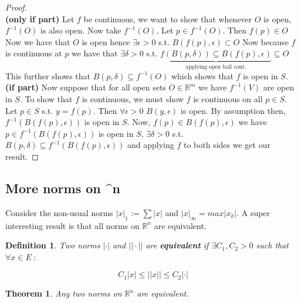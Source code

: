 \documentclass[titlepage]{article}
\newtheorem{theorem}{Theorem}[section]
\newtheorem{definition}{Definition}
\newcommand{\Rn}{\mathbb{R}^n}
\newcommand{\Rm}{\mathbb{R}^m}
\begin{document}
\begin{proof}
\\
\textbf{(only if part)}
Let $f$ be continuous, we want to show that whenever $O$ is open, $f^{-1}(O)$ is also open. Now take $f^{-1}(O)$. Let $p \in f^{-1}(O)$. Then $f(p) \in O$ Now we have that $O$ is open hence $\exists \epsilon > 0$ s.t. $B(f(p),\epsilon) \subset O$ Now because $f$ is continuous at $p$ we have that $\exists \delta > 0$ s.t. $\underbrace{f(B(p, \delta)) \subseteq B(f(p), \epsilon)}_{\text{applying open ball cont.}} \subseteq O$ This further shows that $B(p, \delta) \subseteq f^{-1}(O)$ which shows that $f$ is open in $S$.
\\

\textbf{(if part)}
Now suppose that for all open sets $O \in \Rm$ we have $f^{-1}(V)$ are open in $S$. To show that $f$ is continuous, we must show $f$ is continuous on all $p \in S$. Let $p \in S$ s.t. $y = f(p)$. Then $\forall \epsilon > 0$ $B(y,\epsilon)$ is open. By assumption then, $f^{-1}(B(f(p), \epsilon))$ is open in $S$. Now, $f(p) \in B(f(p), \epsilon)$ we have $p \in f^{-1}(B(f(p), \epsilon))$ is open in $S$, $\exists \delta > 0$ s.t. $B(p, \delta) \subseteq f^{-1}(B(f(p), \epsilon))$ and applying $f$ to both sides we get our result. 
\end{proof}

\subsection{More norms on \Rn}
Consider the non-usual norms $|x|_{1} := \sum |x|$ and $|x|_{\infty} = max |x_{k}|$. A super interesting result is that all norms on $\Rn$ are equivalent. 

\begin{definition}
Two norms $|\cdot|$ and $||\cdot||$ are \textbf{equivalent} if $\exists C_{1}, C_{2} > 0$ such that $\forall x \in E \ :$

$$C_{1}|x| \leq ||x|| \leq C_{2}|\cdot|$$
\end{definition}

\begin{theorem}
Any two norms on $\Rn$ are equivalent. 
\end{theorem}
\end{document}

